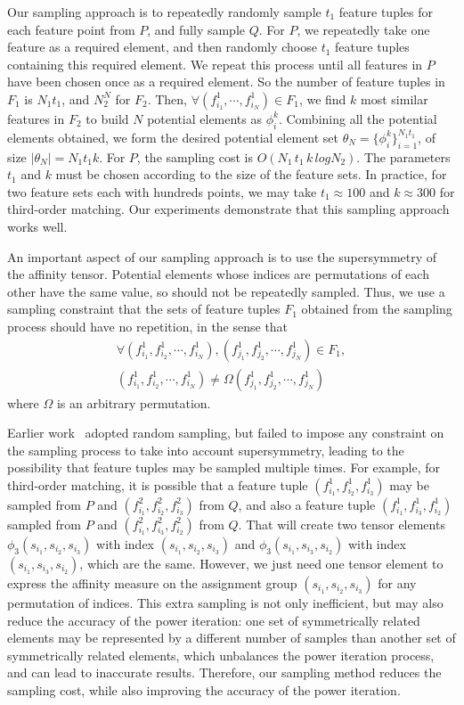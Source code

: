 Our sampling approach is to repeatedly randomly sample $t_1$ feature tuples for each feature point from $P$, and fully sample $Q$.
For $P$, we repeatedly take one feature as a required element, and then randomly choose $t_1$ feature tuples containing this required element.
We repeat this process until all features in $P$ have been chosen once as a required element.
So the number of feature tuples in $F_1$ is $N_1t_1$, and $N_2^N$ for $F_2$.
Then, $\forall (f_{i_1}^1, \cdots, f_{i_N}^1)\in F_1$, we find $k$ most similar features in $F_2$ to build $N$ potential elements as $\phi_i^k$.
Combining all the potential elements obtained, we form the desired potential element set $\theta_N = \{\phi_i^k\}_{i=1}^{N_1 t_1}$, of size $|\theta_N| = N_1 t_1 k$.
For $P$, the sampling cost is $O(N_1 \, t_1 \, k \, logN_2)$.
The parameters $t_1$ and $k$ must be chosen according to the size of the feature sets.
In practice, for two feature sets each with hundreds points,
we may take $t_1 \approx 100$ and $k\approx300$ for third-order matching.
Our experiments demonstrate that this sampling approach works well.

An important aspect of our sampling approach is to use the supersymmetry of the affinity tensor. Potential elements whose indices are permutations of each other
have the same value, so should not be repeatedly sampled.
Thus, we use a sampling constraint that the sets of feature tuples $F_1$ obtained from the sampling process should have no repetition, in the sense that
\begin{eqnarray}
\label{equ:noredun2}
\forall (f_{i_1}^1,f_{i_2}^1,\cdots,f_{i_N}^1),(f_{j_1}^1,f_{j_2}^1,\cdots,f_{j_N}^1) \in F_1,\nonumber\\ (f_{i_1}^1,f_{i_2}^1,\cdots,f_{i_N}^1)\neq\Omega(f_{j_1}^1,f_{j_2}^1,\cdots,f_{j_N}^1)
\end{eqnarray}
where $\Omega$ is an arbitrary permutation.

Earlier work~\cite{Zass08,Duchenne09,Aiping10} adopted random sampling,
but failed to impose any constraint on the sampling process to take into account supersymmetry,
leading to the possibility that feature tuples may be sampled multiple times.
For example, for third-order matching, it is possible that a feature tuple $(f_{i_1}^1, f_{i_2}^1, f_{i_3}^1)$ may be sampled from $P$ and $(f_{i_1}^2, f_{i_2}^2, f_{i_3}^2)$ from $Q$,
and also a feature tuple $(f_{i_1}^1, f_{i_3}^1, f_{i_2}^1)$ sampled from $P$ and $(f_{i_1}^2, f_{i_3}^2, f_{i_2}^2)$ from $Q$. That will create two tensor elements $\phi_3(s_{i_1}, s_{i_2}, s_{i_3})$ with index $(s_{i_1}, s_{i_2}, s_{i_3})$ and $\phi_3(s_{i_1}, s_{i_3}, s_{i_2})$ with index $(s_{i_1}, s_{i_3}, s_{i_2})$, which are the same. However, we just need one tensor element to express the affinity measure on the assignment group $(s_{i_1}, s_{i_2}, s_{i_3})$ for any permutation of indices.
This extra sampling is not only inefficient, but may also reduce the accuracy of the power iteration: one set of symmetrically related elements  may be represented by a different number of samples than another set of  symmetrically related elements, which unbalances the power iteration process, and can lead to inaccurate results.
Therefore, our sampling method reduces the sampling cost, while also improving the accuracy of the power iteration.
